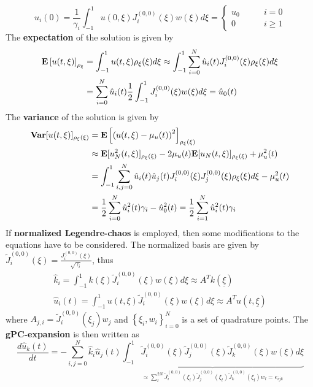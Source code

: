 \documentclass[a4paper,10pt]{article}
\begin{document}
\begin{exa}
\begin{equation}
	\hat{u}_i(0) = \frac{1}{\gamma_i} \int_{-1}^1 u(0,\xi) J_i^{(0,0)}(\xi) w(\xi) d\xi = 
	\begin{cases}
	u_0 \qquad & i=0\\
	0 \qquad & i \geq 1
	\end{cases}
\end{equation}
The \textbf{expectation} of the solution is given by
\begin{align}
	\mathbf{E}\left[ u(t,\xi) \right]_{\rho_\xi} &= \int_{-1}^1 u(t,\xi) \rho_\xi(\xi) d\xi \approx \int_{-1}^1 \sum_{i=0}^N \hat{u}_i(t) J_i^{(0,0)}(\xi) \rho_\xi(\xi) d\xi \\
	&= \sum_{i=0}^N \hat{u}_i(t) \frac{1}{2} \int_{-1}^1 J_i^{(0,0)}(\xi) w(\xi) d\xi = \hat{u}_0(t) \notag
\end{align}
The \textbf{variance} of the solution is given by
\begin{align}
	\mathbf{Var} [u(t,\xi)]_{\rho_\xi(\xi)} &= \mathbf{E} \left[ \left( u(t,\xi) - \mu_u(t) \right)^2 \right]_{\rho_\xi(\xi)} \\
	&\approx \mathbf{E} [ u_N^2(t,\xi) ]_{\rho_\xi(\xi)} - 2 \mu_u(t) \mathbf{E} [u_N(t,\xi)]_{\rho_\xi(\xi)} + \mu_u^2(t) \notag \\
	& = \int_{-1}^1 \sum_{i,j=0}^N \hat{u}_i(t) \hat{u}_j(t) J_i^{(0,0)}(\xi) J_j^{(0,0)}(\xi) \rho_\xi(\xi) d\xi - \mu_u^2(t) \notag \\
	& = \frac{1}{2} \sum_{i=0}^N \hat{u}_i^2(t) \gamma_i - \hat{u}_0^2(t) = \frac{1}{2} \sum_{i=1}^N \hat{u}_i^2(t) \gamma_i \notag
\end{align}
If \textbf{normalized Legendre-chaos} is employed, then some modifications to the equations have to be considered. The normalized basis are given by $ \tilde{J}_i^{(0,0)}(\xi) = \frac{J_i^{(0,0)}(\xi)}{\sqrt{\gamma_i}} $, thus
\begin{align}
	\hat{k}_i = \int_{-1}^{1} k(\xi)\tilde{J}_i^{(0,0)}(\xi)w(\xi)d\xi \approx A^T k(\underline{\xi}) \label{eq:gPC-kExpansion} \\
	\hat{u}_i(t) = \int_{-1}^{1} u(t,\xi)\tilde{J}_i^{(0,0)}(\xi)w(\xi)d\xi \approx A^T u(t,\underline{\xi})
\end{align}
where $ A_{j,i} = \tilde{J}_i^{(0,0)}(\xi_j) w_j $ and $\left\lbrace \xi_i, w_i \right\rbrace_{i=0}^N $ is a set of quadrature points. The \textbf{gPC-expansion} is then written as
\begin{equation}
	\frac{d\hat{u}_k(t)}{dt} = - \sum_{i,j=0}^N \hat{k}_i \hat{u}_j(t) \underbrace{\int_{-1}^1 \tilde{J}_i^{(0,0)}(\xi) \tilde{J}_j^{(0,0)}(\xi) \tilde{J}_k^{(0,0)}(\xi) w(\xi) d\xi}_{\approx \sum_l^{2N} \tilde{J}_i^{(0,0)}(\xi_l) \tilde{J}_j^{(0,0)}(\xi_l) \tilde{J}_k^{(0,0)}(\xi_l) w_l = e_{ijk}}

\end{equation}
\end{exa}
\end{document}

